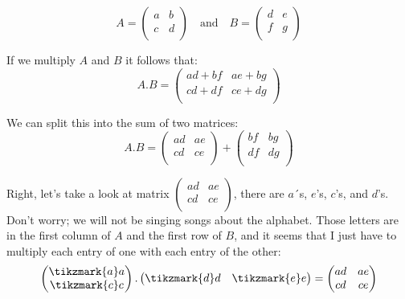 \documentclass[a4,12pt,twosided,openany]{memoir}
\begin{document}
\[A = 
\begin{pmatrix}
a & b \\
c & d\\
\end{pmatrix} \quad \textrm{and} \quad  B = 
\begin{pmatrix}
d & e \\
f & g\\
\end{pmatrix}
\]
\par 
\indent
If we multiply $A$ and $B$ it follows that:
\[A.B = 
\begin{pmatrix}
ad + bf & ae + bg \\
cd + df & ce + dg \\
\end{pmatrix}
\]
\par 
\indent
We can split this into the sum of two matrices:
\begin{equation} \label{eq:mm}
A.B = 
\begin{pmatrix}
ad  & ae  \\
cd  & ce  \\
\end{pmatrix}
+
\begin{pmatrix}
bf &  bg \\
df &  dg \\
\end{pmatrix}
\end{equation}
\par 
\indent
Right, let's take a look at matrix $\begin{pmatrix}
ad  & ae  \\
cd  & ce  \\
\end{pmatrix}$, there are $a$´s, $e$'s, $c$'s, and $d$'s. Don’t worry; we will not be singing songs about the alphabet. Those letters are in the first column of $A$ and the first row of $B$, and it seems that I just have to multiply each entry of one with each entry of the other:
\[\begin{pmatrix}
 \tikzmark{a}a\\
 \tikzmark{c}c\\
\end{pmatrix}.
\begin{pmatrix}
 \tikzmark{d}d &  \tikzmark{e}e \\
\end{pmatrix} = \begin{pmatrix}
ad  & ae  \\
cd  & ce  \\
\end{pmatrix}
\]
\end{document}
